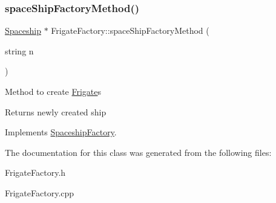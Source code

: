 \subsubsection{\texorpdfstring{space\+Ship\+Factory\+Method()}{spaceShipFactoryMethod()}}
{\footnotesize\ttfamily \hyperlink{classSpaceship}{Spaceship} $\ast$ Frigate\+Factory\+::space\+Ship\+Factory\+Method (\begin{DoxyParamCaption}\item[{string}]{n }\end{DoxyParamCaption})\hspace{0.3cm}{\ttfamily [virtual]}}

Method to create \hyperlink{classFrigate}{Frigate}\textquotesingle{}s \begin{DoxyReturn}{Returns}
newly created ship 
\end{DoxyReturn}


Implements \hyperlink{classSpaceshipFactory_a70b50dd616cb16f50088eff9ca07cda9}{Spaceship\+Factory}.



The documentation for this class was generated from the following files\+:\begin{DoxyCompactItemize}
\item 
Frigate\+Factory.\+h\item 
Frigate\+Factory.\+cpp\end{DoxyCompactItemize}
